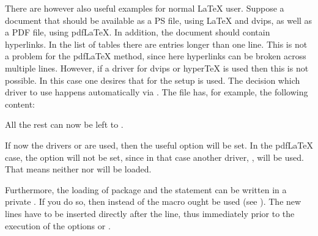 \begin{Example}
  There are however also useful examples for normal {\LaTeX} user.  Suppose a
  document that should be available as a PS file, using {\LaTeX} and dvips, as
  well as a PDF file, using pdf{\LaTeX}.  In addition, the document should
  contain hyperlinks.  In the list of tables there are entries longer than one
  line.  This is not a problem for the pdf{\LaTeX} method, since here
  hyperlinks can be broken across multiple lines.  However, if a
   driver for dvips or hyper{\TeX} is used then this is not
  possible.  In this case one desires that for the  setup
   is used. The decision which  driver
  to use happens automatically via . The file has, for
  example, the following content:

  All the rest can now be left to .
  If now the  drivers  or
   are used, then the useful  option
   will be set. In the pdf{\LaTeX} case, the option
  will not be set, since in that case another  driver,
  , will be used. That means neither 
  nor  will be loaded.
\end{Example}

Furthermore, the loading of package  and
the  statement can be written in a private
. If you do so, then instead of  the
macro  ought be used (see \cite{latex:clsguide}).  The
new lines have to be inserted directly after the  line,
thus immediately prior to the execution of the options  or
.%
%
\EndIndexGroup


